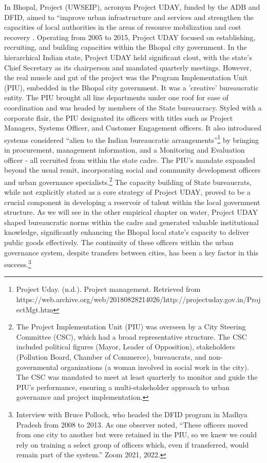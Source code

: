 In Bhopal, Project (UWSEIP), acronym Project UDAY, funded by the ADB and DFID, aimed to ``improve urban infrastructure and services and strengthen the capacities of local authorities in the areas of resource mobilization and cost recovery \citep{Auerbach2020}. Operating from 2005 to 2015, Project UDAY focused on establishing, recruiting, and building capacities within the Bhopal city government. In the hierarchical Indian state, Project UDAY held significant clout, with the state's Chief Secretary as its chairperson and mandated quarterly meetings. However, the real muscle and gut of the project was the Program Implementation Unit (PIU), embedded in the Bhopal city government. It was a 'creative' bureaucratic entity. The PIU brought all line departments under one roof for ease of coordination and was headed by members of the State bureaucracy. Styled with a corporate flair, the PIU designated its officers with titles such as Project Managers, Systems Officer, and Customer Engagement officers. It also introduced systems considered ``alien to the Indian bureaucratic arrangements''\footnote{Project Uday. (n.d.). Project management. Retrieved from https://web.archive.org/web/20180828214026/http://projectuday.gov.in/ProjectMgt.htm} by bringing in procurement, management information, and a Monitoring and Evaluation officer - all recruited from within the state cadre. The PIU's mandate expanded beyond the usual remit, incorporating social and community development officers and urban governance specialists.\footnote{The Project Implementation Unit (PIU) was overseen by a City Steering Committee (CSC), which had a broad representative structure. The CSC included political figures (Mayor, Leader of Opposition), stakeholders (Pollution Board, Chamber of Commerce), bureaucrats, and non-governmental organizations (a woman involved in social work in the city). The CSC was mandated to meet at least quarterly to monitor and guide the PIU's performance, ensuring a multi-stakeholder approach to urban governance and project implementation.} The capacity building of State bureaucrats, while not explicitly stated as a core strategy of Project UDAY, proved to be a crucial component in developing a reservoir of talent within the local government structure. As we will see in the other empirical chapter on water, Project UDAY shaped bureaucratic norms within the cadre and generated valuable institutional knowledge, significantly enhancing the Bhopal local state's capacity to deliver public goods effectively. The continuity of these officers within the urban governance system, despite transfers between cities, has been a key factor in this success.\footnote{Interview with Bruce Pollock, who headed the DFID program in Madhya Pradesh from 2008 to 2013. As one observer noted, ``These officers moved from one city to another but were retained in the PIU, so we knew we could rely on training a select group of officers which, even if transferred, would remain part of the system.'' Zoom 2021, 2022.}

